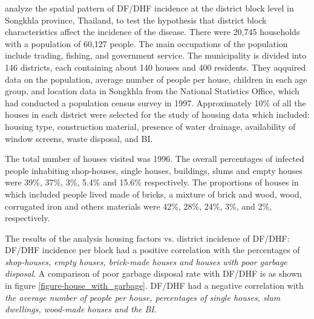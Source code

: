 \documentclass[review]{elsarticle}
\begin{document}
\cite{thammapalo2008environmental} analyze the spatial pattern of DF/DHF incidence at the district block level in Songkhla province, Thailand, to test the hypothesis that district block characteristics affect the incidence of the disease. There were 20,745 households with a population of 60,127 people. The main occupations of the population include trading, fishing, and government service. The municipality is divided into 146 districts, each containing about 140 houses and 400 residents. They aqquired data on the population, average number of people per house, children in each age group, and location data in Songkhla from the National Statistics Office, which had conducted a population census survey in 1997. Approximately 10\% of all the houses in each district were selected for the study of housing data which included: housing type, construction material, presence of water drainage, availability of window screens, waste disposal, and BI. 

The total number of houses visited was 1996. The overall percentages of infected people inhabiting shop-houses, single houses, buildings, slums and empty houses were 39\%, 37\%, 3\%, 5.4\% and 15.6\% respectively. The proportions of houses in which included people lived made of bricks, a mixture of brick and wood, wood, corrugated iron and others materials were 42\%, 28\%, 24\%, 3\%, and 2\%, respectively.

The results of the analysis housing factors vs. district incidence of DF/DHF: DF/DHF incidence per block had a positive correlation with the percentages of \textit{shop-houses, empty houses, brick-made houses and houses with poor garbage disposal}. A comparison of poor garbage disposal rate with DF/DHF is as shown in figure \ref{figure-house_with_garbage}. DF/DHF had a negative correlation with \textit{the average number of people per house, percentages of single houses, slum dwellings, wood-made houses and the BI}. 




\end{document}
